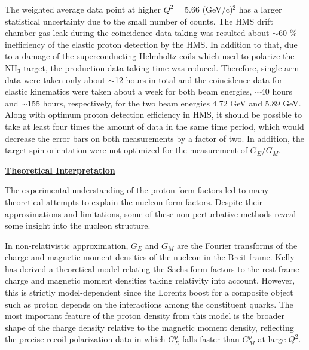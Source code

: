 \documentclass[12pt]{article}
\begin{document}
The weighted average data point at higher  $Q^2=5.66$ (GeV/c)$^2$ has a larger statistical uncertainty due to the small number of counts.
The HMS drift chamber gas leak during the coincidence data taking was resulted about $\sim$60 \% inefficiency of the elastic proton detection by the HMS. In addition to that, due to a damage of the superconducting Helmholtz coils which used to polarize the NH$_3$ target, the production data-taking time was reduced. 
Therefore,  single-arm data were taken only about $\sim$12 hours in total and the coincidence data for elastic kinematics were taken about a week for both beam energies, $\sim$40 hours and $\sim$155 hours, respectively, for the two beam energies 4.72 GeV and 5.89 GeV. 
Along with optimum proton detection efficiency in HMS, it should be possible to take at least four times the amount of data in the same time period, which would decrease the error bars on both measurements by a factor of two. In addition, the target spin orientation were not optimized for the measurement of $G_E/G_M$.

{
\raggedleft
\underline{\textbf{Theoretical Interpretation}}
}

The experimental understanding of the proton form factors led to many theoretical attempts to explain the nucleon form factors. Despite their approximations and limitations, some of these non-perturbative methods reveal some insight into the nucleon structure. 

In non-relativistic approximation, $G_E$ and $G_M$ are the Fourier transforms of the charge and magnetic moment densities of the nucleon in the Breit frame. 
Kelly \cite{99} has derived a theoretical model relating the Sachs form factors to the rest frame charge and magnetic moment densities taking relativity into account. However, this is strictly model-dependent since the Lorentz boost for a composite object such as proton depends on the interactions among the constituent quarks. The most important feature of the proton density from this model is the broader shape of the charge density relative to the magnetic moment density, reflecting the precise recoil-polarization data in which $G_E^p$ falls faster than $G_M^p$ at large $Q^2$. 
\end{document}
